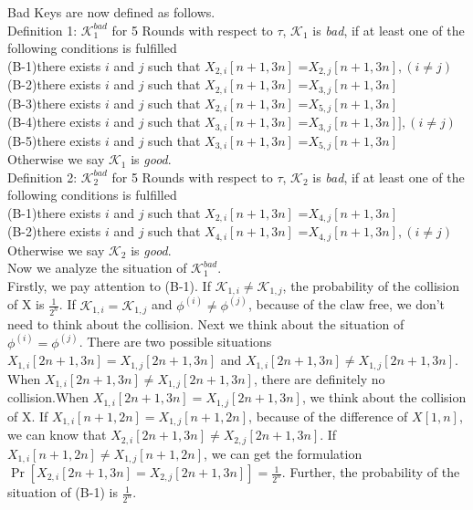 \documentclass{article}
\begin{document}
Bad Keys are now defined as follows.\\
Definition 1: $\mathcal{K}_{1}^{bad}$  for 5 Rounds
with respect to $\tau$, $\mathcal{K}_{1}$  is {\it bad}, if at least one of the following conditions is fulfilled\\
(B-1)there exists $i$ and $j$ such that $X_{2,i}[n+1,3n]$ =$X_{2,j}[n+1,3n],(i\neq j)$\\
(B-2)there exists $i$ and $j$ such that $X_{2,i}[n+1,3n]$ =$X_{3,j}[n+1,3n]$\\
(B-3)there exists $i$ and $j$ such that $X_{2,i}[n+1,3n]$ =$X_{5,j}[n+1,3n]$\\
(B-4)there exists $i$ and $j$ such that $X_{3,i}[n+1,3n]$ =$X_{3,j}[n+1,3n]],(i\neq j)$\\
(B-5)there exists $i$ and $j$ such that $X_{3,i}[n+1,3n]$ =$X_{5,j}[n+1,3n]$\\
Otherwise we say $\mathcal{K}_{1}$ is {\it good}.\\

Definition 2: $\mathcal{K}_{2}^{bad}$  for 5 Rounds
with respect to $\tau$, $\mathcal{K}_{2}$  is {\it bad}, if at least one of the following conditions is fulfilled \\
(B-1)there exists $i$ and $j$ such that $X_{2,i}[n+1,3n]$ =$X_{4,j}[n+1,3n]$\\
(B-2)there exists $i$ and $j$ such that $X_{4,i}[n+1,3n]$ =$X_{4,j}[n+1,3n],(i\neq j)$\\
Otherwise we say $\mathcal{K}_{2}$ is {\it good}.\\

Now we analyze the situation of $\mathcal{K}_{1}^{bad}$.\\
Firstly, we pay attention to (B-1). If $\mathcal{K}_{1,i}\neq\mathcal{K}_{1,j}$, the probability of the collision of X is $\frac{1}{2^{n}}$. If $\mathcal{K}_{1,i}=\mathcal{K}_{1,j}$ and $\phi^{(i)}\neq\phi^{(j)}$, because of the claw free, we don't need to think about the collision. Next we think about the situation of $\phi^{(i)}=\phi^{(j)}$. There are two possible situations $X_{1,i}[2n+1,3n]=X_{1,j}[2n+1,3n]$ and $X_{1,i}[2n+1,3n]\neq X_{1,j}[2n+1,3n]$. When $X_{1,i}[2n+1,3n]\neq X_{1,j}[2n+1,3n]$, there are definitely no collision.When $X_{1,i}[2n+1,3n]=X_{1,j}[2n+1,3n]$, we think about the collision of X.
If $X_{1,i}[n+1,2n]=X_{1,j}[n+1,2n]$, because of the difference of $X[1,n]$, we can know that $X_{2,i}[2n+1,3n]\neq X_{2,j}[2n+1,3n]$. If $X_{1,i}[n+1,2n]\neq X_{1,j}[n+1,2n]$, we can get the formulation
$\Pr[X_{2,i}[2n+1,3n]=X_{2,j}[2n+1,3n]]=\frac{1}{2^{n}}$.
Further, the probability of the situation of (B-1) is $\frac{1}{2^{n}}$.
\end{document}
